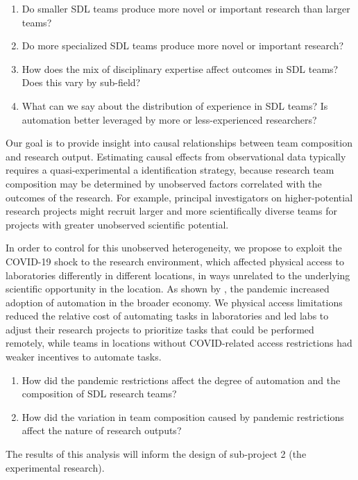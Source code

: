 \documentclass{article}
\begin{document}
\begin{enumerate}
    \item Do smaller SDL teams produce more novel or important research than larger teams? 
    \item Do more specialized SDL teams produce more novel or important research?
    \item How does the mix of disciplinary expertise affect outcomes in SDL teams? Does this vary by sub-field?
    \item What can we say about the distribution of experience in SDL teams? Is automation better leveraged by more or less-experienced researchers?
\end{enumerate}
Our goal is to provide insight into causal relationships between team composition and research output. Estimating causal effects from observational data typically requires a quasi-experimental a identification strategy, because research team composition may be determined by unobserved factors correlated with the outcomes of the research. For example, principal investigators on higher-potential research projects might recruit larger and more scientifically diverse teams for projects with greater unobserved scientific potential.

In order to control for this unobserved heterogeneity, we propose to exploit the COVID-19 shock to the research environment, which affected physical access to laboratories differently in different locations, in ways unrelated to the underlying  scientific opportunity in the location. As shown by \cite{broady2023automation}, the pandemic increased adoption of automation in the broader economy. We physical access limitations reduced the relative cost of automating tasks in laboratories and led labs to adjust their research projects to prioritize tasks that could be performed remotely, while teams in locations without COVID-related access restrictions had weaker incentives to automate tasks.  
\begin{enumerate}
    \item How did the pandemic restrictions affect the   degree of automation and the composition of SDL research teams?
    \item How did the variation in team composition caused by pandemic restrictions affect the nature of research outputs?
\end{enumerate}

The results of this analysis will inform the design of sub-project 2 (the experimental research).
\end{document}
